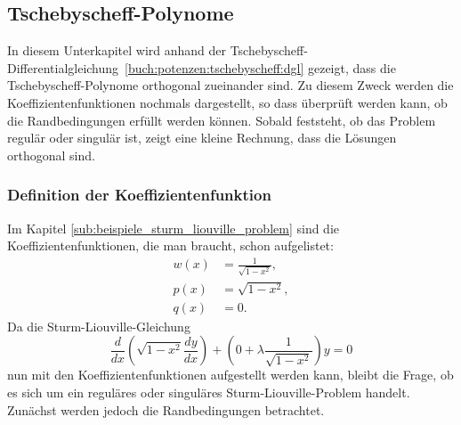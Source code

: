 %
%
%

\subsection{Tschebyscheff-Polynome
\label{sturmliouville:sub:tschebyscheff-polynome}}
In diesem Unterkapitel wird anhand der
Tschebyscheff-Differentialgleichung~\eqref{buch:potenzen:tschebyscheff:dgl} gezeigt, dass die Tschebyscheff-Polynome orthogonal zueinander sind.
Zu diesem Zweck werden die Koeffizientenfunktionen nochmals dargestellt, so dass
überprüft werden kann, ob die Randbedingungen erfüllt werden können.
Sobald feststeht, ob das Problem regulär oder singulär ist, zeigt eine
kleine Rechnung, dass die Lösungen orthogonal sind.

\subsubsection*{Definition der Koeffizientenfunktion}
Im Kapitel \ref{sub:beispiele_sturm_liouville_problem} sind die
Koeffizientenfunktionen, die man braucht, schon aufgelistet:
\begin{align*}
	w(x) &= \frac{1}{\sqrt{1-x^2}}, \\
	p(x) &= \sqrt{1-x^2}, \\
	q(x) &= 0.
\end{align*}
Da die Sturm-Liouville-Gleichung
\begin{equation}
	\label{eq:sturm-liouville-equation-tscheby}
	\frac{d}{dx} (\sqrt{1-x^2} \frac{dy}{dx}) +
	(0 + \lambda \frac{1}{\sqrt{1-x^2}}) y
	=
	0 
\end{equation}
nun mit den Koeffizientenfunktionen aufgestellt werden kann, bleibt die Frage,
ob es sich um ein reguläres oder singuläres Sturm-Liouville-Problem handelt.
Zunächst werden jedoch die Randbedingungen betrachtet.

